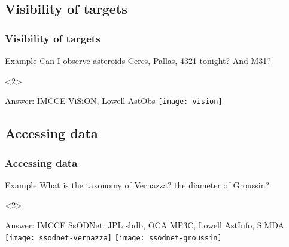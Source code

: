 \subsection{Visibility of targets}
\begin{frame}
  \frametitle{Visibility of targets}

  \begin{overlayarea}{\textwidth}{0.15\textheight}
    \vspace{-0.5em}
    \begin{exampleblock}{Example}
      Can I observe asteroids Ceres, Pallas, 4321 tonight? And M31?
    \end{exampleblock}
  \end{overlayarea}

  \begin{overlayarea}{\textwidth}{0.8\textheight}
    \begin{onlyenv}<2>
      \begin{block}{Answer: IMCCE ViSiON, Lowell AstObs}
        \hspace{.25\textwidth}\texttt{[image: vision]}
      \end{block}
    \end{onlyenv}
  \end{overlayarea}

\end{frame}

\subsection{Accessing data}
\begin{frame}
  \frametitle{Accessing data}

  \begin{overlayarea}{\textwidth}{0.15\textheight}
    \vspace{-0.5em}
    \begin{exampleblock}{Example}
      What is the taxonomy of Vernazza? the diameter of Groussin?
    \end{exampleblock}
  \end{overlayarea}

  \begin{overlayarea}{\textwidth}{0.8\textheight}
    \begin{onlyenv}<2>
      \begin{block}{Answer: IMCCE SsODNet, JPL sbdb, OCA MP3C, Lowell AstInfo, SiMDA}
        \hspace{.05\hsize}\texttt{[image: ssodnet-vernazza]}
        \texttt{[image: ssodnet-groussin]}
      \end{block}
    \end{onlyenv}
  \end{overlayarea}

\end{frame}

